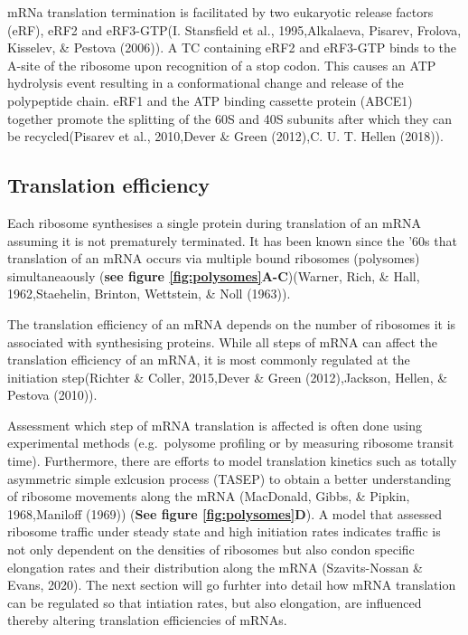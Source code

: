 \documentclass[12pt,openany]{book}
\begin{document}
mRNa translation termination is facilitated by two eukaryotic release
factors (eRF), eRF2 and eRF3-GTP(I. Stansfield et al., 1995,Alkalaeva,
Pisarev, Frolova, Kisselev, \& Pestova (2006)). A TC containing eRF2 and
eRF3-GTP binds to the A-site of the ribosome upon recognition of a stop
codon. This causes an ATP hydrolysis event resulting in a conformational
change and release of the polypeptide chain. eRF1 and the ATP binding
cassette protein (ABCE1) together promote the splitting of the 60S and
40S subunits after which they can be recycled(Pisarev et al., 2010,Dever
\& Green (2012),C. U. T. Hellen (2018)).

\subsection{Translation efficiency}

Each ribosome synthesises a single protein during translation of an mRNA
assuming it is not prematurely terminated. It has been known since the
'60s that translation of an mRNA occurs via multiple bound ribosomes
(polysomes) simultaneaously (\textbf{see figure
\ref{fig:polysomes}A-C})(Warner, Rich, \& Hall, 1962,Staehelin, Brinton,
Wettstein, \& Noll (1963)).

The translation efficiency of an mRNA depends on the number of ribosomes
it is associated with synthesising proteins. While all steps of mRNA can
affect the translation efficiency of an mRNA, it is most commonly
regulated at the initiation step(Richter \& Coller, 2015,Dever \& Green
(2012),Jackson, Hellen, \& Pestova (2010)).

Assessment which step of mRNA translation is affected is often done
using experimental methods (e.g.~polysome profiling or by measuring
ribosome transit time). Furthermore, there are efforts to model
translation kinetics such as totally asymmetric simple exlcusion process
(TASEP) to obtain a better understanding of ribosome movements along the
mRNA (MacDonald, Gibbs, \& Pipkin, 1968,Maniloff (1969)) (\textbf{See
figure \ref{fig:polysomes}D}). A model that assessed ribosome traffic
under steady state and high initiation rates indicates traffic is not
only dependent on the densities of ribosomes but also condon specific
elongation rates and their distribution along the mRNA (Szavits-Nossan
\& Evans, 2020). The next section will go furhter into detail how mRNA
translation can be regulated so that intiation rates, but also
elongation, are influenced thereby altering translation efficiencies of
mRNAs.
\end{document}
